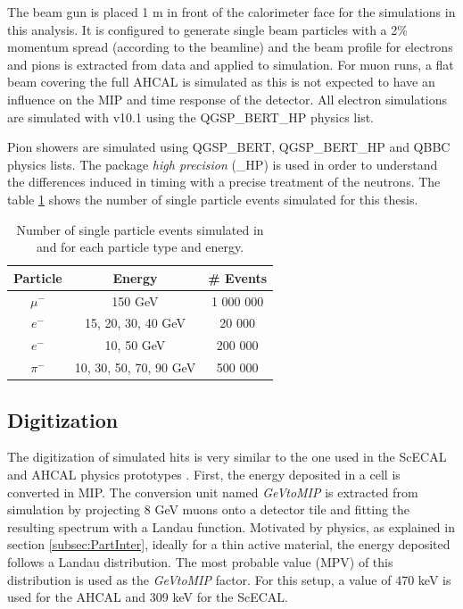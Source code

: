 The beam gun is placed 1 m in front of the calorimeter face for the simulations in this analysis. It is configured to generate single beam particles with a 2\% momentum spread (according to the beamline) and the beam profile for electrons and pions is extracted from data and applied to simulation. For muon runs, a flat beam covering the full AHCAL is simulated as this is not expected to have an influence on the MIP and time response of the detector. All electron simulations are simulated with \geant v10.1 using the QGSP\_BERT\_HP physics list.

Pion showers are simulated using QGSP\_BERT, QGSP\_BERT\_HP and QBBC physics lists. The package \textit{high precision} (\_HP) is used in order to understand the differences induced in timing with a precise treatment of the neutrons. The table \ref{table:event_sim} shows the number of single particle events simulated for this thesis.

\begin{table}[htb!]
  \centering
  \caption{Number of single particle events simulated in \mokka and \ddhep for each particle type and energy.}
  \label{table:event_sim}
  \begin{tabular}{@{} ccc @{}}
    \hline
    Particle & Energy & \# Events \\
    \hline
    $\mu^-$ & 150 GeV & 1 000 000 \\
    \hline
    $e^-$ & 15, 20, 30, 40 GeV & 20 000 \\
    $e^-$ & 10, 50 GeV & 200 000 \\
    \hline
    $\pi^-$ & 10, 30, 50, 70, 90 GeV & 500 000 \\
    \hline
  \end{tabular}
\end{table}

\subsection{Digitization}

The digitization of simulated hits is very similar to the one used in the ScECAL and AHCAL physics prototypes \cite{2011_JINST_6_P04003}. First, the energy deposited in a cell is converted in MIP. The conversion unit named \textit{GeVtoMIP} is extracted from simulation by projecting 8 GeV muons onto a detector tile and fitting the resulting spectrum with a Landau function. Motivated by physics, as explained in section \ref{subsec:PartInter}, ideally for a thin active material, the energy deposited follows a Landau distribution. The most probable value (MPV) of this distribution is used as the \textit{GeVtoMIP} factor. For this setup, a value of 470 keV is used for the AHCAL and 309 keV for the ScECAL.

